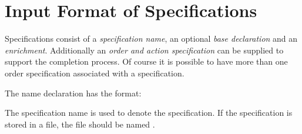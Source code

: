                                                         
\section{Input Format of Specifications}

Specifications consist of a {\em specification name}, an optional 
{\em base declaration} and an {\em enrichment}. Additionally an
{\em order and action specification} can be supplied to support the completion
process. Of course it is possible to have more than one order specification
associated with a specification.

\begin{syntax}
 \IS  {} 
                   \AND [ \nt{base} ]  
                   \AND {} 
\end{syntax}

\noindent
The name declaration has the format:

\begin{syntax}
  \IS {} \END
\end{syntax}

\noindent
The specification name is used to denote the specification.
If the specification is stored in a file,
the file should be named .

